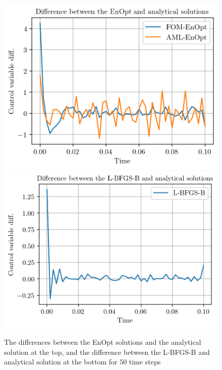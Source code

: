 \begin{figure}
\centering
\includegraphics{Plots/solutionsDifferNT50.png}
\includegraphics{Plots/solutionsDifferLBFGSBAnalyticalNT50.png}
\caption{\label{solutionsDifferNT50}The differences between the EnOpt solutions and the analytical solution at the top, and the difference between the L-BFGS-B and analytical solution at the bottom for $50$ time steps}
\end{figure}

